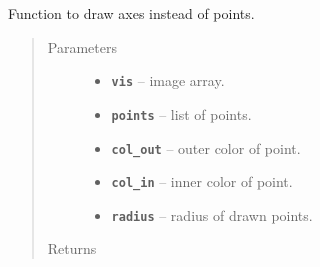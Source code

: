 \documentclass[letterpaper,10pt,english]{sphinxmanual}
\begin{document}
\begin{fulllineitems}
\label{RRtoolbox.lib:RRtoolbox.lib.image.drawcooraxes}
Function to draw axes instead of points.
\begin{quote}\begin{description}
\item[{Parameters}] \leavevmode\begin{itemize}
\item {} 
\textbf{\texttt{vis}} -- image array.

\item {} 
\textbf{\texttt{points}} -- list of points.

\item {} 
\textbf{\texttt{col\_out}} -- outer color of point.

\item {} 
\textbf{\texttt{col\_in}} -- inner color of point.

\item {} 
\textbf{\texttt{radius}} -- radius of drawn points.

\end{itemize}

\item[{Returns}] \leavevmode


\end{description}\end{quote}

\end{fulllineitems}

\end{document}
